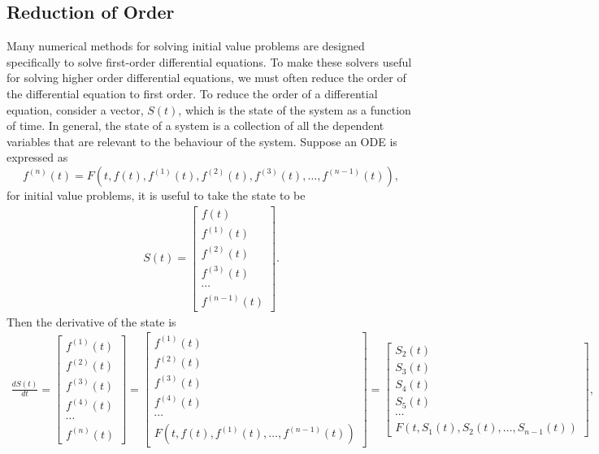 \subsection*{Reduction of Order}
Many numerical methods for solving initial value problems are designed specifically to solve first-order differential equations. To make these solvers useful for solving higher order differential equations, we must often reduce the order of the differential equation to first order. To reduce the order of a differential equation, consider a vector, $S(t)$, which is the state of the system as a function of time. In general, the state of a system is a collection of all the dependent variables that are relevant to the behaviour of the system. Suppose an ODE is  expressed as
\[f^{(n)}(t) = F\left(t, f(t), f^{(1)}(t), f^{(2)}(t), f^{(3)}(t),\ldots, f^{(n-1)}(t)\right),\]
for initial value problems, it is useful to take the state to be
\[\begin{split}
S(t) =\left[\begin{array}{c}
f(t) \\
f^{(1)}(t) \\
f^{(2)}(t) \\
f^{(3)}(t) \\
\cdots \\
f^{(n-1)}(t)
\end{array}\right].
\end{split}\]
Then the derivative of the state is
\[\begin{split}
\frac{dS(t)}{dt} =\!\left[\begin{array}{c}
f^{(1)}(t) \\
f^{(2)}(t) \\
f^{(3)}(t) \\
f^{(4)}(t) \\
\cdots \\
f^{(n)}(t)
\end{array}\right]\!=\!\left[\begin{array}{c}
f^{(1)}(t) \\
f^{(2)}(t) \\
f^{(3)}(t) \\
f^{(4)}(t) \\
\cdots \\
F\left(t, f(t), f^{(1)}(t),\ldots, f^{(n-1)}(t)\right)
\end{array}\right]\!=\!\left[\begin{array}{c}
S_2(t) \\
S_3(t) \\
S_4(t) \\
S_5(t) \\
\cdots \\
F\left(t, S_1(t), S_2(t),\ldots, S_{n-1}(t)\right)
\end{array}\right]\!,
\end{split}\]
